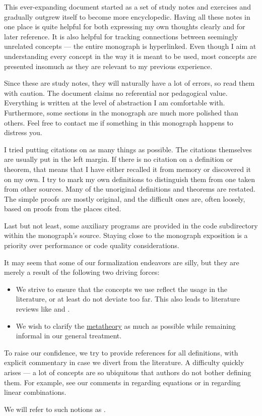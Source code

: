 
This ever-expanding document started as a set of study notes and exercises and gradually outgrew itself to become more encyclopedic. Having all these notes in one place is quite helpful for both expressing my own thoughts clearly and for later reference. It is also helpful for tracking connections between seemingly unrelated concepts --- the entire monograph is hyperlinked. Even though I aim at understanding every concept in the way it is meant to be used, most concepts are presented insomuch as they are relevant to my previous experience.

Since these are study notes, they will naturally have a lot of errors, so read them with caution. The document claims no referential nor pedagogical value. Everything is written at the level of abstraction I am comfortable with. Furthermore, some sections in the monograph are much more polished than others. Feel free to contact me if something in this monograph happens to distress you.

I tried putting citations on as many things as possible. The citations themselves are usually put in the left margin. If there is no citation on a definition or theorem, that means that I have either recalled it from memory or discovered it on my own. I try to mark my own definitions to distinguish them from one taken from other sources. Many of the unoriginal definitions and theorems are restated. The simple proofs are mostly original, and the difficult ones are, often loosely, based on proofs from the places cited.

Last but not least, some auxiliary programs are provided in the code subdirectory within the monograph's source. Staying close to the monograph exposition is a priority over performance or code quality considerations.

\begin{concept}\label{con:assumed_knowledge}
  It may seem that some of our formalization endeavors are silly, but they are merely a result of the following two driving forces:
  \begin{itemize}
    \item We strive to ensure that the concepts we use reflect the usage in the literature, or at least do not deviate too far. This also leads to literature reviews like  and .

    \item We wish to clarify the \hyperref[con:metalogic]{metatheory} as much as possible while remaining informal in our general treatment.
  \end{itemize}

  To raise our confidence, we try to provide references for all definitions, with explicit commentary in case we divert from the literature. A difficulty quickly arises --- a lot of concepts are so ubiquitous that authors do not bother defining them. For example, see our comments in  regarding equations or in  regarding linear combinations.

  We will refer to such notions as .
\end{concept}

